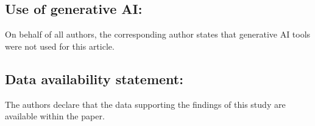 \documentclass[a4paper,reqno]{amsart}
\theoremstyle{definition}
\numberwithin{equation}{section}
\begin{document}
\subsection*{Use of generative AI:} On behalf of all authors, the corresponding author states that generative AI tools were not used for this article.

\subsection*{Data availability statement:} The authors declare that the data supporting the findings of this study are available within the paper.

 

 
\end{document}
